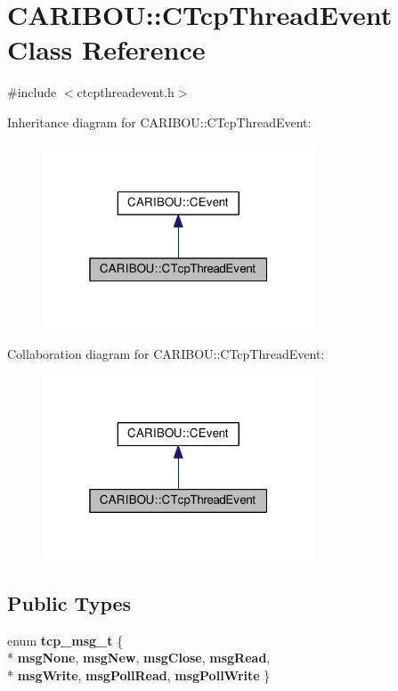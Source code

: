 \section{C\+A\+R\+I\+B\+OU\+:\+:C\+Tcp\+Thread\+Event Class Reference}
\label{class_c_a_r_i_b_o_u_1_1_c_tcp_thread_event}


{\ttfamily \#include $<$ctcpthreadevent.\+h$>$}



Inheritance diagram for C\+A\+R\+I\+B\+OU\+:\+:C\+Tcp\+Thread\+Event\+:
\nopagebreak
\begin{figure}[H]
\begin{center}
\leavevmode
\includegraphics[width=229pt]{class_c_a_r_i_b_o_u_1_1_c_tcp_thread_event__inherit__graph}
\end{center}
\end{figure}


Collaboration diagram for C\+A\+R\+I\+B\+OU\+:\+:C\+Tcp\+Thread\+Event\+:
\nopagebreak
\begin{figure}[H]
\begin{center}
\leavevmode
\includegraphics[width=229pt]{class_c_a_r_i_b_o_u_1_1_c_tcp_thread_event__coll__graph}
\end{center}
\end{figure}
\subsection*{Public Types}
\begin{DoxyCompactItemize}
\item 
enum {\bf tcp\+\_\+msg\+\_\+t} \{ \\*
{\bf msg\+None}, 
{\bf msg\+New}, 
{\bf msg\+Close}, 
{\bf msg\+Read}, 
\\*
{\bf msg\+Write}, 
{\bf msg\+Poll\+Read}, 
{\bf msg\+Poll\+Write}
 \}
\end{DoxyCompactItemize}
